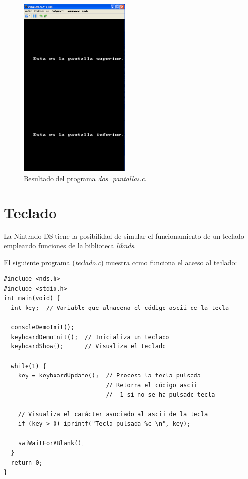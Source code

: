 \begin{figure}[t]
\centering
 \includegraphics[height=9cm]{Figuras/C3/c3_sol-ejercicios-dospantallas.png}
\caption{Resultado del programa \textit{dos\_pantallas.c}.}
\label{p3_c2_dos_pantallas}
\end{figure}

\section{Teclado}
La Nintendo DS tiene la posibilidad de simular el funcionamiento de un teclado empleando funciones de la biblioteca \textit{libnds}.

\begin{example}
El siguiente programa (\textit{teclado.c}) muestra como funciona el acceso al teclado:

\begin{lstlisting}
#include <nds.h>
#include <stdio.h>
int main(void) {    
  int key;  // Variable que almacena el código ascii de la tecla
    
  consoleDemoInit();  
  keyboardDemoInit();  // Inicializa un teclado
  keyboardShow();      // Visualiza el teclado

  while(1) {       
    key = keyboardUpdate();  // Procesa la tecla pulsada
                             // Retorna el código ascii 
                             // -1 si no se ha pulsado tecla 

    // Visualiza el carácter asociado al ascii de la tecla 
    if (key > 0) iprintf("Tecla pulsada %c \n", key); 

    swiWaitForVBlank(); 
  }
  return 0;
}
\end{lstlisting}
\end{example}

